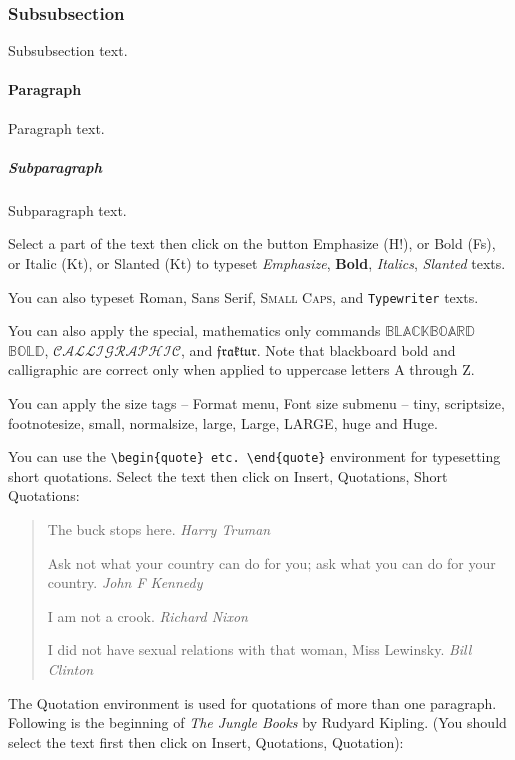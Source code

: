 \documentclass{article}%
\begin{document}
\subsubsection{Subsubsection}
Subsubsection text.

\paragraph{Paragraph}
Paragraph text.

\subparagraph{Subparagraph}Subparagraph text.\vspace{2mm}

Select a part of the text then click on the button Emphasize (H!), or Bold (Fs), or
Italic (Kt), or Slanted (Kt) to typeset \emph{Emphasize}, \textbf{Bold},
\textit{Italics}, \textsl{Slanted} texts.

You can also typeset \textrm{Roman}, \textsf{Sans Serif}, \textsc{Small Caps}, and
\texttt{Typewriter} texts.

You can also apply the special, mathematics only commands $\mathbb{BLACKBOARD}$
$\mathbb{BOLD}$, $\mathcal{CALLIGRAPHIC}$, and $\mathfrak{fraktur}$. Note that
blackboard bold and calligraphic are correct only when applied to uppercase letters A
through Z.

You can apply the size tags -- Format menu, Font size submenu -- {\tiny tiny},
{\scriptsize scriptsize}, {\footnotesize footnotesize}, {\small small}, {\normalsize
normalsize}, {\large large}, {\Large Large}, {\LARGE LARGE}, {\huge huge} and {\Huge
Huge}.

You can use the \verb"\begin{quote} etc. \end{quote}" environment for typesetting
short quotations. Select the text then click on Insert, Quotations, Short Quotations:

\begin{quote}
The buck stops here. \emph{Harry Truman}

Ask not what your country can do for you; ask what you can do for your
country. \emph{John F Kennedy}

I am not a crook. \emph{Richard Nixon}

I did not have sexual relations with that woman, Miss Lewinsky. \emph{Bill Clinton}
\end{quote}

The Quotation environment is used for quotations of more than one paragraph. Following
is the beginning of \emph{The Jungle Books} by Rudyard Kipling. (You should select
the text first then click on Insert, Quotations, Quotation):
\end{document}
